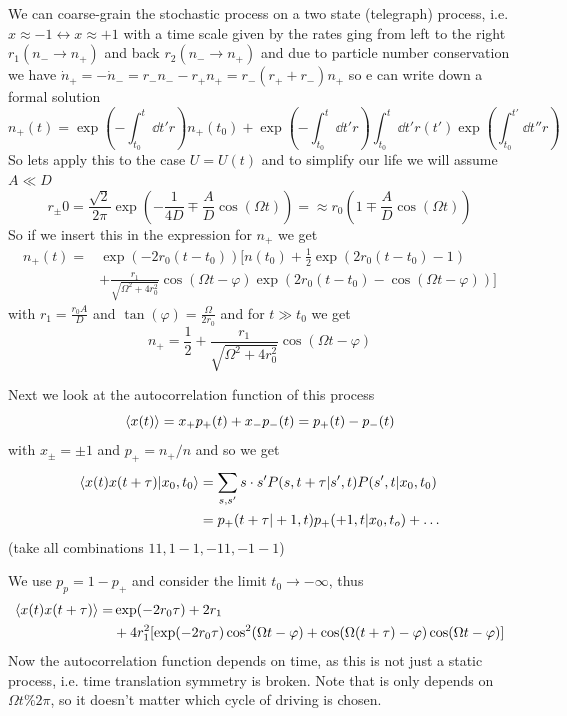 \documentclass{notebook}
\begin{document}
We can coarse-grain the stochastic process on a two state (telegraph) process, i.e. $x \approx -1 \leftrightarrow x \approx +1$ with a time scale given by the rates ging from left to the right $r_1(n_- \to n_+)$ and back $r_2(n_- \to n_+)$
and due to particle number conservation we have $\dot{n}_+ = -\dot{n}_- = r_- n_- - r_+ n_+ = r_-(r_+ + r_-) n_+$ so e can write down a formal solution
%
\begin{equation}
	n_+(t) = \exp(-\int_{t_0}^t \dd{t'} r) n_+(t_0) + \exp(-\int_{t_0}^t \dd{t'} r) \int_{t_0}^t \dd{t'} r(t') \exp(\int_{t_0}^{t'} \dd{t''} r)
\end{equation}
%
So lets apply this to the case $U = U(t)$ and to simplify our life we will assume $A \ll D$
%
\begin{equation}
r_{\pm}0 = \frac{\sqrt{2}}{2 \pi} \exp(-\frac{1}{4D} \mp \frac{A}{D} \cos(\Omega t))= \approx r_0 \left(1 \mp \frac{A}{D} \cos(\Omega t) \right)
\end{equation}
%
So if we insert this in the expression for $n_+$ we get
%
\begin{align*}
n_+(t) =& \exp(-2r_0 (t-t_0)) [n(t_0) + \frac{1}{2} \exp(2 r_0 (t-t_0) - 1) \\
&+ \frac{r_1}{\sqrt{\Omega^2 + 4r_0^2}} \cos(\Omega t - \varphi) \exp(2r_0(t-t_0) - \cos(\Omega t-\varphi))]
\end{align*}
%
with $r_1 = \frac{r_0 A}{D}$ and $\tan(\varphi) = \frac{\Omega}{2 r_0}$ and for $t \gg t_0$ we get
%
\begin{equation}
n_+ = \frac{1}{2} + \frac{r_1}{\sqrt{\Omega^2 + 4r_0^2}} \cos(\Omega t - \varphi)
\end{equation}
%

Next we look at the autocorrelation function of this process
%
\begin{equation}
	\expval{x(t)} = x_+ p_+(t) + x_- p_-(t) = p_+(t) - p_-(t)
\end{equation}
%
with $x_{\pm} = \pm 1$ and $p_+ = n_+ / n$ and so we get
%
\begin{align*}
	\expval{x(t) x(t+\tau) | x_0, t_0} &= \sum_{s,s'} s \cdot s' P(s,t+\tau | s', t) P(s',t|x_0,t_0) \\
	&= p_+(t+\tau | +1, t) p_+(+1, t|x_0,t_o) + \dots
\end{align*}
%
(take all combinations $11, 1-1, -11,-1-1$)

We use $p_p = 1-p_+$ and consider the limit $t_0 \to -\infty$, thus
%
\begin{align*}
	\expval{x(t) x(t+\tau)} =& \exp(-2 r_0 \tau) + 2 r_1 \\
	&+ 4 r_1^2 [\exp(-2 r_0 \tau) \cos^2(\Omega t - \varphi) + \cos(\Omega (t+\tau) - \varphi) \cos(\Omega t - \varphi)]
\end{align*}
%
Now the autocorrelation function depends on time, as this is not just a static process, i.e. time translation symmetry is broken. Note that is only depends on $\Omega t \% 2 \pi$, so it doesn't matter which cycle of driving is chosen.
\end{document}
